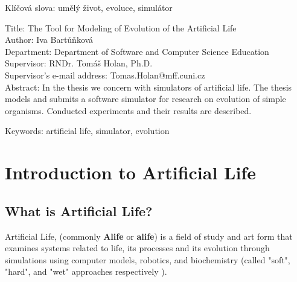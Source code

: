 \documentclass[a4paper,12pt]{report}
\begin{document}


\vspace{8mm}

\noindent Klíčová slova: umělý život, evoluce, simulátor

\vspace{10mm}

\noindent
Title: The Tool for Modeling of Evolution of the Artificial Life\\
Author: Iva Bartů\v{n}kov\'{a}\\
Department: Department of Software and Computer Science Education\\
Supervisor: RNDr. Tom\'{a}\v{s} Holan, Ph.D.\\
Supervisor's e-mail address: Tomas.Holan@mff.cuni.cz\\

\noindent Abstract: In the thesis we concern with simulators of artificial life. The thesis models and submits a software simulator for research on evolution of simple organisms. Conducted experiments and their results are described. 
 
\vspace{8mm}

\noindent Keywords: artificial life, simulator, evolution




\chapter{Introduction to Artificial Life}


\section{What is Artificial Life?}
Artificial Life, (commonly \textbf{Alife} or \textbf{alife}) is a field of study and art form that examines systems related to life, its processes and its evolution through simulations using computer models, robotics, and biochemistry (called "soft", "hard", and "wet" approaches respectively \cite{Bedau}).
\end{document}
